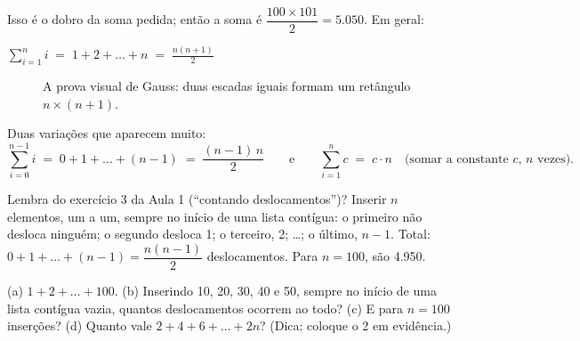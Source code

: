 Isso é o dobro da soma pedida; então a soma é $\dfrac{100 \times 101}{2} = 5.050$. Em geral:

\begin{center}
\colorbox{edtealclaro}{\large\quad $\displaystyle \sum_{i=1}^{n} i \;=\; 1 + 2 + \dots + n \;=\; \frac{n(n+1)}{2}$\quad}
\end{center}

\begin{figure}[!htb]
\centering
{}
\caption{A prova visual de Gauss: duas escadas iguais formam um retângulo $n \times (n+1)$.}
\end{figure}

Duas variações que aparecem muito:
\[
\sum_{i=0}^{n-1} i \;=\; 0 + 1 + \dots + (n-1) \;=\; \frac{(n-1)\,n}{2}
\qquad\text{e}\qquad
\sum_{i=1}^{n} c \;=\; c \cdot n \quad \text{(somar a constante } c\text{, } n \text{ vezes).}
\]

\begin{conexao}
Lembra do exercício 3 da Aula 1 (\enquote{contando deslocamentos})? Inserir $n$ elementos, um a
um, sempre no início de uma lista contígua: o primeiro não desloca ninguém; o segundo desloca 1;
o terceiro, 2; \dots; o último, $n - 1$. Total: $0 + 1 + \dots + (n - 1) = \dfrac{n(n-1)}{2}$
deslocamentos. Para $n = 100$, são 4.950.
\end{conexao}

\begin{exrapido}
(a) $1 + 2 + \dots + 100$. (b) Inserindo 10, 20, 30, 40 e 50, sempre no início de uma lista
contígua vazia, quantos deslocamentos ocorrem ao todo? (c) E para $n = 100$ inserções?
(d) Quanto vale $2 + 4 + 6 + \dots + 2n$? (Dica: coloque o 2 em evidência.)
\end{exrapido}

